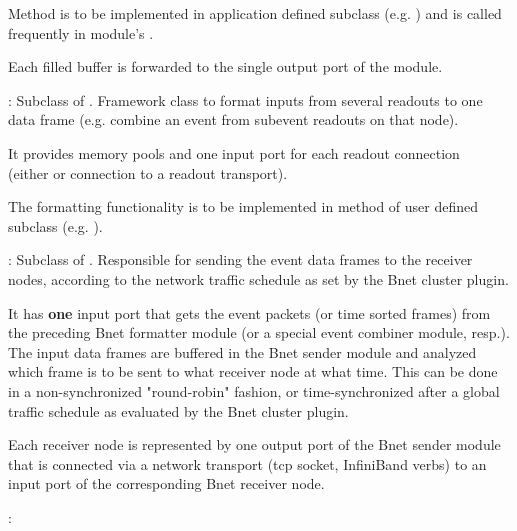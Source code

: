 \begin{description}
\begin{compactenum}
  \item Method  is to be implemented in application 
      defined subclass (e.g. ) and is called frequently 
      in module's . 
  \item Each filled buffer is forwarded to the single output port of the module. 
\end{compactenum}
\item[\class{bnet::FormaterModule}] :  
   Subclass of . 
   Framework class to format inputs from several readouts to one data 
   frame (e.g. combine an event from subevent readouts on that node). 
\begin{compactenum}
  \item It provides memory pools and one input port for each 
      readout connection \\
      (either  or connection to a 
      readout transport). 
  \item The formatting functionality is to be implemented in method 
       of user defined subclass (e.g. ).
\end{compactenum}
\item[\class{bnet::SenderModule}] : 
Subclass of . 
   Responsible for sending the event data frames to the receiver 
   nodes, according to the network traffic schedule as set by the Bnet cluster plugin.
\begin{compactenum}
  \item It has {\bf one} input port that gets the event packets 
      (or time sorted frames) from the preceding 
      Bnet formatter module (or a special event combiner module, resp.). 
      The input data frames are buffered in the Bnet sender module and analyzed 
      which frame is to be sent to what receiver node at what time. 
      This can be done in a non-synchronized "round-robin" fashion, 
      or time-synchronized after a global traffic schedule as evaluated by 
      the Bnet cluster plugin.  
  \item Each receiver node is represented by one output port of 
      the Bnet sender module that is connected via a network transport 
      (tcp socket, InfiniBand verbs) to an input port of the 
      corresponding Bnet receiver node.
\end{compactenum}
\item[\class{bnet::ReceiverModule}] : 

\end{description}
